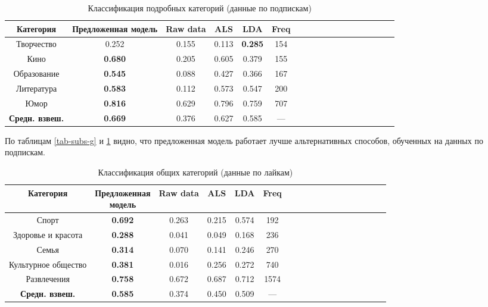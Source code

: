 \documentclass[times,specification,annotation]{itmo-student-thesis}
\begin{document}
\begin{table}[!h]
\caption{Классификация подробных категорий (данные по подпискам)}\label{tab-subs-d}
\centering
\begin{tabular}{|*{18}{c|}}\hline
Категория & Предложенная модель  & Raw data & ALS & LDA & Freq \\\hline
Творчество                    & 0.252 & 0.155 & 0.113 & \textbf{0.285} & 154  \\\hline
Кино       & \textbf{0.680} & 0.205 & 0.605 & 0.379 & 155 \\\hline
Образование   & \textbf{0.545} & 0.088 & 0.427 & 0.366 & 167 \\\hline
Литература  & \textbf{0.583} & 0.112 & 0.573 & 0.547 & 200 \\\hline
Юмор                  & \textbf{0.816} & 0.629 & 0.796 & 0.759 &  707 \\\hline
\textbf{Средн. взвеш.}   & \textbf{0.669} & 0.376 & 0.627 & 0.585  & --- \\\hline
\end{tabular}
\end{table}

По таблицам \ref{tab-subs-g} и \ref{tab-subs-d} видно, что предложенная модель работает лучше альтернативных способов, обученных на данных по подпискам.  

\begin{table}[!h]
\caption{Классификация общих категорий (данные по лайкам)}\label{tab-likes-g}
\centering
\begin{tabular}{|*{18}{c|}}\hline
Категория & \thead{Предложенная \\ модель}  & Raw data & ALS & LDA & Freq \\\hline
Спорт                         &  \textbf{0.692} & 0.263 & 0.215 & 0.574 & 192 \\\hline
Здоровье и красота                         &  \textbf{0.288} & 0.041 & 0.049 & 0.168 & 236 \\\hline
Семья       &  \textbf{0.314} & 0.070 & 0.141 & 0.246 & 270  \\\hline
Культурное общество   &  \textbf{0.381} & 0.016 & 0.256 & 0.272 & 740 \\\hline
Развлечения &  \textbf{0.758} & 0.672 & 0.687 & 0.712 & 1574 \\\hline
\textbf{Средн. взвеш.}                  &  \textbf{0.585} & 0.374 & 0.450 & 0.509 & --- \\\hline
\end{tabular}
\end{table}
\end{document}
